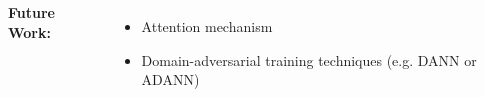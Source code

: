 \documentclass[25pt, a0paper,
               colspace=15mm, subcolspace=0mm,
               blockverticalspace=17mm]{tikzposter} %
\begin{document}
\begin{columns}
{    \textbf{Future Work:}
    \begin{itemize}
        \item  Attention mechanism
        \item Domain-adversarial training techniques (e.g. DANN or ADANN)
    \end{itemize}
  }
\end{columns}
\end{document}
